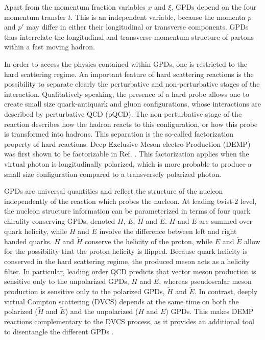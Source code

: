Apart from the momentum fraction variables $x$ and $\xi$, GPDs depend on the
four momentum transfer $t$.  This is an independent variable, because the
momenta $p$ and $p'$ may differ in either their longitudinal or transverse
components.  GPDs thus interrelate the longitudinal and transverse momentum
structure of partons within a fast moving hadron.

In order to access the physics contained within GPDs, one is restricted to the
hard scattering regime.  An important feature of hard scattering reactions is
the possibility to separate clearly the perturbative and non-perturbative stages
of the interaction.  Qualitatively speaking, the presence of a hard probe
allows one to create small size quark-antiquark and gluon configurations, whose
interactions are described by perturbative QCD (pQCD).  The non-perturbative
stage of the reaction describes how the hadron reacts to this configuration, or
how this probe is transformed into hadrons.  This separation is the so-called
factorization property of hard reactions.  Deep Exclusive Meson
electro-Production (DEMP) was first shown to be factorizable in
Ref. \cite{Co97}.  This factorization applies when the virtual photon is
longitudinally polarized, which is more probable to produce a small size
configuration compared to a transversely polarized photon.

GPDs are universal quantities and reflect the structure of the nucleon
independently of the reaction which probes the nucleon.  At leading twist-2
level, the nucleon structure information can  be parameterized in terms of four
quark chirality conserving GPDs, denoted $H$, $E$, $\tilde{H}$ and $\tilde{E}$.
$H$ and $E$ are summed over quark helicity, while $\tilde{H}$ and $\tilde{E}$
involve the difference between  left and right handed quarks.  $H$ and
$\tilde{H}$ conserve the helicity of the proton, while $E$ and $\tilde{E}$
allow for the possibility that the proton helicity is flipped.  Because quark
helicity is conserved in the hard scattering regime, the produced meson acts as
a helicity filter.  In particular, leading order QCD predicts that vector meson
production is sensitive only to the unpolarized GPDs, $H$ and $E$, whereas
pseudoscalar meson production is sensitive only to the polarized GPDs,
$\tilde{H}$ and $\tilde{E}$.  In contrast, deeply virtual Compton scattering
(DVCS) depends at the same time on both the polarized ($\tilde{H}$ and  
$\tilde{E}$) and the unpolarized ($H$ and $E$) GPDs.  This makes DEMP
reactions complementary to the DVCS process, as it
provides an additional tool to disentangle the different GPDs \cite{Go01}.

